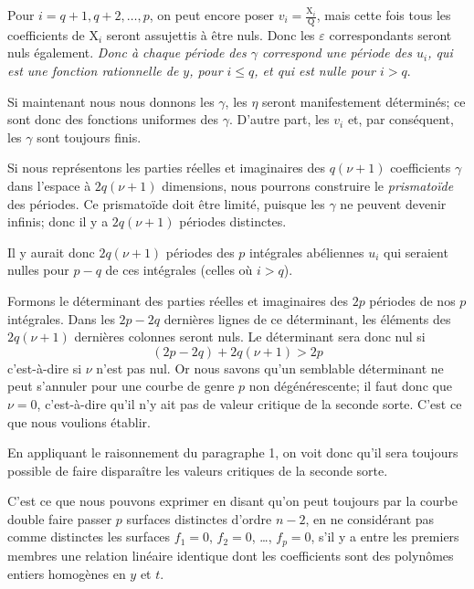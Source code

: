 \documentclass{article}
\begin{document}
Pour $i = q+1, q+2, \dots, p$, on peut encore poser $v_{i} = \frac{\mathrm{X}_{i}}{\mathrm{Q}}$, mais cette fois tous les coefficients de $\mathrm{X}_{i}$ seront assujettis à être nuls. Donc les $\varepsilon$ correspondants seront nuls également. \emph{Donc à chaque période des $\gamma$ correspond une période des $u_{i}$, qui est une fonction rationnelle de $y$, pour $i \le q$, et qui est nulle pour $i > q$}.

Si maintenant nous nous donnons les $\gamma$, les $\eta$ seront manifestement déterminés; ce sont donc des fonctions uniformes des $\gamma$. D'autre part, les $v_{i}$ et, par conséquent, les $\gamma$ sont toujours finis.

Si nous représentons les parties réelles et imaginaires des $q(\nu+1)$ coefficients $\gamma$ dans l'espace à $2q(\nu+1)$ dimensions, nous pourrons construire le \emph{prismatoïde} des périodes. Ce prismatoïde doit être limité, puisque les $\gamma$ ne peuvent devenir infinis; donc il y a $2q(\nu+1)$ périodes distinctes.

Il y aurait donc $2q(\nu+1)$ périodes des $p$ intégrales abéliennes $u_{i}$ qui seraient nulles pour $p-q$ de ces intégrales (celles où $i > q$).

Formons le déterminant des parties réelles et imaginaires des $2p$ périodes de nos $p$ intégrales. Dans les $2p - 2q$ dernières lignes de ce déterminant, les éléments des $2q(\nu+1)$ dernières colonnes seront nuls. Le déterminant sera donc nul si
\[
(2p - 2q) + 2q(\nu+1) > 2p
\]
c'est-à-dire si $\nu$ n'est pas nul. Or nous savons qu'un semblable déterminant ne peut s'annuler pour une courbe de genre $p$ non dégénérescente; il faut donc que $\nu = 0$, c'est-à-dire qu'il n'y ait pas de valeur critique de la seconde sorte. C'est ce que nous voulions établir.

En appliquant le raisonnement du paragraphe 1, on voit donc qu'il sera toujours possible de faire disparaître les valeurs critiques de la seconde sorte.

C'est ce que nous pouvons exprimer en disant qu'on peut toujours par la courbe double faire passer $p$ surfaces distinctes d'ordre $n-2$, en ne considérant pas comme distinctes les surfaces $f_{1}=0$, $f_{2}=0$, \dots, $f_{p}=0$, s'il y a entre les premiers membres une relation linéaire identique dont les coefficients sont des polynômes entiers homogènes en $y$ et $t$.
\end{document}
